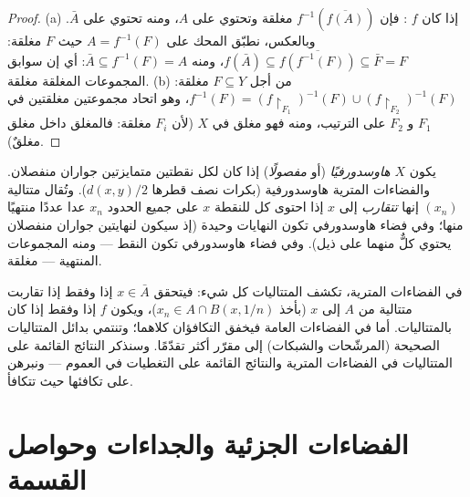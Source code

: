 \begin{proof}
(a) إذا كان $f$ : فإن $f^{-1}(\overline{f(A)})$ مغلقة وتحتوي على $A$، ومنه
تحتوي على $\bar A$. وبالعكس، نطبّق المحك على $A = f^{-1}(F)$
حيث $F$ مغلقة: $f(\bar A) \subseteq
\overline{f(f^{-1}(F))} \subseteq \bar F = F$، ومنه $\bar A
\subseteq f^{-1}(F) = A$: أي إن سوابق المجموعات
المغلقة مغلقة.
(b) من أجل $F \subseteq Y$ مغلقة: $f^{-1}(F) =
(f\restriction_{F_1})^{-1}(F) \cup (f\restriction_{F_2})^{-1}
(F)$، وهو اتحاد مجموعتين
مغلقتين في $F_1$ و $F_2$ على الترتيب، ومنه فهو مغلق في $X$ (لأن
$F_i$ مغلقة: فالمغلق داخل مغلق مغلقٌ).
\end{proof}

\begin{definition}\label{def:b3:topology:hausdorff}
يكون $X$ \emph{هاوسدورفيًا} (أو
\emph{مفصولًا}) إذا كان لكل نقطتين متمايزتين جواران منفصلان.
والفضاءات المترية هاوسدورفية (بكرات نصف قطرها $d(x,y)/2$).
وتُقال متتالية $(x_n)$ إنها \emph{تتقارب} إلى $x$ إذا احتوى كل
 للنقطة $x$ على جميع الحدود $x_n$ عدا عددًا منتهيًا منها؛
وفي فضاء هاوسدورفي تكون النهايات وحيدة (إذ سيكون لنهايتين
جواران منفصلان يحتوي كلٌّ منهما على ذيل). وفي فضاء هاوسدورفي
تكون النقط --- ومنه المجموعات المنتهية --- مغلقة.
\end{definition}

\begin{remark}\label{rem:b3:topology:sequences}
في الفضاءات المترية، تكشف المتتاليات كل شيء: فيتحقق
$x \in \bar A$ إذا وفقط إذا تقاربت متتالية من $A$ إلى $x$ (بأخذ
$x_n \in A \cap
B(x, 1/n)$)، ويكون $f$  إذا وفقط إذا كان  بالمتتاليات.
أما في الفضاءات العامة فيخفق التكافؤان كلاهما؛ وتنتمي بدائل
المتتاليات الصحيحة (المرشّحات والشبكات) إلى مقرّر أكثر تقدّمًا.
وسنذكر النتائج القائمة على المتتاليات في الفضاءات المترية
والنتائج القائمة على التغطيات في العموم --- ونبرهن على تكافئها
حيث تتكافأ.
\end{remark}

\section{الفضاءات الجزئية والجداءات وحواصل القسمة}

